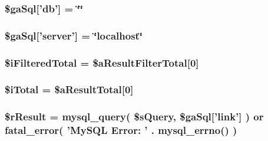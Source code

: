 \hypertarget{post_8php_aaa5ffcba6d18eacf65c42024605b6486}{
\subsubsection[{\$ga\+Sql}]{\setlength{\rightskip}{0pt plus 5cm}\$ga\+Sql\mbox{[}'db'\mbox{]} = \char`\"{}\char`\"{}}}\label{post_8php_aaa5ffcba6d18eacf65c42024605b6486}
\hypertarget{post_8php_a23a651ce4e9cd3741cb88709c0bfdf8e}{
\subsubsection[{\$ga\+Sql}]{\setlength{\rightskip}{0pt plus 5cm}\$ga\+Sql\mbox{[}'server'\mbox{]} = \char`\"{}localhost\char`\"{}}}\label{post_8php_a23a651ce4e9cd3741cb88709c0bfdf8e}
\hypertarget{post_8php_a48dbbdca4a5a8b8d03ef6c76dd65a5c1}{
\subsubsection[{\$i\+Filtered\+Total}]{\setlength{\rightskip}{0pt plus 5cm}\$i\+Filtered\+Total = \$a\+Result\+Filter\+Total\mbox{[}0\mbox{]}}}\label{post_8php_a48dbbdca4a5a8b8d03ef6c76dd65a5c1}
\hypertarget{post_8php_a7ba288b7060e9fe77272bafe66c2403d}{
\subsubsection[{\$i\+Total}]{\setlength{\rightskip}{0pt plus 5cm}\$i\+Total = \$a\+Result\+Total\mbox{[}0\mbox{]}}}\label{post_8php_a7ba288b7060e9fe77272bafe66c2403d}
\hypertarget{post_8php_a8f423fcb1764890d70da997a4140f703}{
\subsubsection[{\$r\+Result}]{\setlength{\rightskip}{0pt plus 5cm}\$r\+Result = mysql\+\_\+query( \$s\+Query, \$ga\+Sql\mbox{[}'link'\mbox{]} ) or {\bf fatal\+\_\+error}( 'My\+S\+Q\+L Error\+: ' . mysql\+\_\+errno() )}}\label{post_8php_a8f423fcb1764890d70da997a4140f703}

